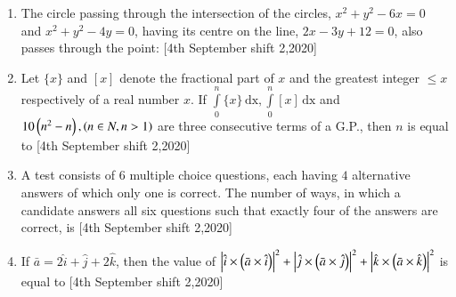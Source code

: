 \documentclass[journal]{IEEEtran}
\begin{document}
\begin{enumerate}[start=16]
\begin{enumerate}
\end{enumerate}

\item The circle passing through the intersection of the circles, $x^2+y^2-6x=0$ and $x^2+y^2-4y=0$, having its centre on the line, $2x-3y+12=0$, also passes through the point: \hfill{[4th September shift 2,2020]}
\begin{enumerate}
\end{enumerate}

\item Let $\{x\}$ and ${[x]}$ denote the fractional part of $x$ and the greatest integer $\leq x$ respectively of a real number $x$. If $\int\limits_0^n\{x\} \, \text{dx},\int\limits_0^n{[x]} \,\text{dx}$ and $10\left(n^2-n\right),\left(n \in N,n>1\right)$ are three consecutive terms of a G.P., then $n$ is equal to \underline{\hspace{1cm}} \hfill{[4th September shift 2,2020]}\\ 

\item A test consists of $6$ multiple choice questions, each having $4$ alternative answers of which only one is correct. The number of ways, in which a candidate answers all six questions such that exactly four of the answers are correct, is \underline{\hspace{1cm}} \hfill{[4th September shift 2,2020]}\\

\item If $\bar{a} = 2\hat{i} + \hat{j} + 2\hat{k}$, then the value of $\left\vert\hat{i} \times \left(\bar{a} \times \hat{i}\right)\right\vert^2 + \left\vert\hat{j} \times \left(\bar{a} \times \hat{j}\right)\right\vert^2 + \left\vert\hat{k} \times \left(\bar{a} \times \hat{k}\right)\right\vert^2$  is equal to \underline{\hspace{1cm}} \hfill{[4th September shift 2,2020]}\\


\end{enumerate}
\end{document}
